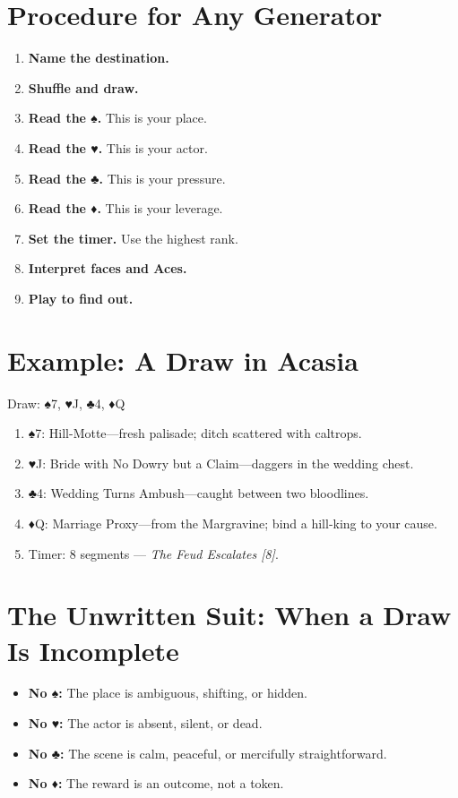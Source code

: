 \documentclass[12pt,oneside]{book}
\renewcommand{\spadesuit}{♠}
\renewcommand{\heartsuit}{♥}
\renewcommand{\clubsuit}{♣}
\renewcommand{\diamondsuit}{♦}
\begin{document}
\section*{Procedure for Any Generator}

\begin{enumerate}
    \item \textbf{Name the destination.}
    \item \textbf{Shuffle and draw.}
    \item \textbf{Read the \spadesuit.} This is your place.
    \item \textbf{Read the \heartsuit.} This is your actor.
    \item \textbf{Read the \clubsuit.} This is your pressure.
    \item \textbf{Read the \diamondsuit.} This is your leverage.
    \item \textbf{Set the timer.} Use the highest rank.
    \item \textbf{Interpret faces and Aces.}
    \item \textbf{Play to find out.}
\end{enumerate}

\section*{Example: A Draw in Acasia}

Draw: \spadesuit 7, \heartsuit J, \clubsuit 4, \diamondsuit Q

\begin{enumerate}
    \item \spadesuit 7: Hill-Motte---fresh palisade; ditch scattered with caltrops.
    \item \heartsuit J: Bride with No Dowry but a Claim---daggers in the wedding chest.
    \item \clubsuit 4: Wedding Turns Ambush---caught between two bloodlines.
    \item \diamondsuit Q: Marriage Proxy---from the Margravine; bind a hill-king to your cause.
    \item Timer: 8 segments --- \textit{The Feud Escalates [8]}.
\end{enumerate}

\section*{The Unwritten Suit: When a Draw Is Incomplete}

\begin{itemize}
    \item \textbf{No \spadesuit:} The place is ambiguous, shifting, or hidden.
    \item \textbf{No \heartsuit:} The actor is absent, silent, or dead.
    \item \textbf{No \clubsuit:} The scene is calm, peaceful, or mercifully straightforward.
    \item \textbf{No \diamondsuit:} The reward is an outcome, not a token.
\end{itemize}
\end{document}
